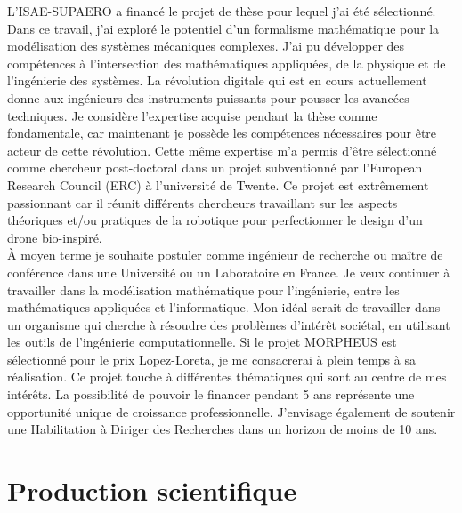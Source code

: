 \documentclass[12pt, french]{article}
\begin{document}
	L'ISAE-SUPAERO a financé le projet de thèse pour lequel j'ai été sélectionné. Dans ce travail, j'ai exploré le potentiel d'un formalisme mathématique pour la modélisation des systèmes mécaniques complexes. J'ai pu développer des compétences à l'intersection des mathématiques appliquées, de la physique et de l'ingénierie des systèmes. La révolution digitale qui est en cours actuellement donne aux ingénieurs des instruments puissants pour pousser les avancées techniques. Je considère l'expertise acquise pendant la thèse comme fondamentale, car maintenant je possède les compétences nécessaires pour être acteur de cette révolution. Cette même expertise m'a permis d'être sélectionné comme chercheur post-doctoral dans un projet subventionné par l'European Research Council (ERC) à l'université de Twente. Ce projet est extrêmement passionnant car il réunit différents chercheurs travaillant sur les aspects théoriques et/ou pratiques de la robotique pour perfectionner le design d'un drone bio-inspiré. \\
	
	\`A moyen terme je souhaite postuler comme ingénieur de recherche ou maître de conférence dans une Université ou un Laboratoire en France. Je veux continuer à travailler dans la modélisation mathématique pour l'ingénierie, entre les mathématiques appliquées et l'informatique. Mon idéal serait de travailler dans un organisme qui cherche à résoudre des problèmes d'intérêt sociétal, en utilisant les outils de l'ingénierie computationnelle.  Si le projet MORPHEUS est sélectionné pour le prix Lopez-Loreta, je me consacrerai à plein temps à sa réalisation. Ce projet touche à différentes thématiques qui sont au centre de mes intérêts. La possibilité de pouvoir le financer pendant 5 ans représente une opportunité unique de croissance professionnelle. J'envisage également de soutenir une Habilitation à Diriger des Recherches dans un horizon de moins de 10 ans.
	
	
	\section{Production scientifique}
	{
		
		
	}
	
\end{document}
